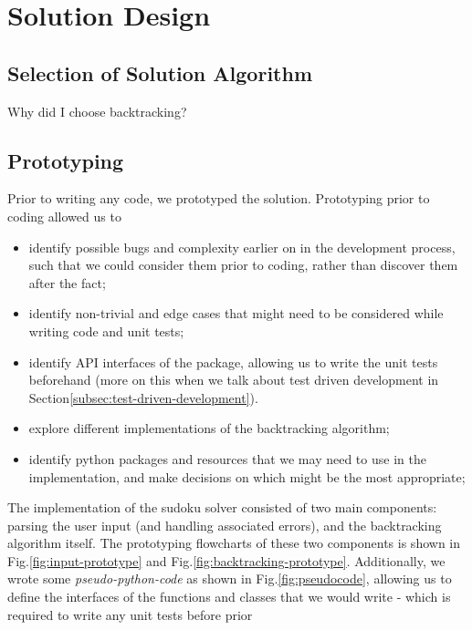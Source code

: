 
\section{Solution Design}\label{sec:selection-of-solution-algorithm-and-prototyping}
    \subsection{Selection of Solution Algorithm}\label{subsec:solution-algorithm}
    Why did I choose backtracking?

    \subsection{Prototyping}\label{subsec:prototyping}
    Prior to writing any code, we prototyped the solution.
    Prototyping prior to coding allowed us to
    \begin{itemize}
        \item identify possible bugs and complexity earlier on in the development process, such that we could consider them
        prior to coding, rather than discover them after the fact;
        \item identify non-trivial and edge cases that might need to be considered while writing code and unit tests;
        \item identify API interfaces of the package, allowing us to write the unit tests beforehand (more on this when
        we talk about test driven development in Section\eqref{subsec:test-driven-development}).
        \item explore different implementations of the backtracking algorithm;
        \item identify python packages and resources that we may need to use in the implementation, and make decisions on which
        might be the most appropriate;
    \end{itemize}
    The implementation of the sudoku solver consisted of two main components: parsing the user input (and handling
    associated errors), and the backtracking algorithm itself.
    The prototyping flowcharts of these two components is shown in Fig.\eqref{fig:input-prototype} and Fig.\eqref{fig:backtracking-prototype}.
    Additionally, we wrote some \textit{pseudo-python-code} as shown in Fig.\eqref{fig:pseudocode}, allowing us to define
    the interfaces of the functions and classes that we would write - which is required to write any unit tests before prior
